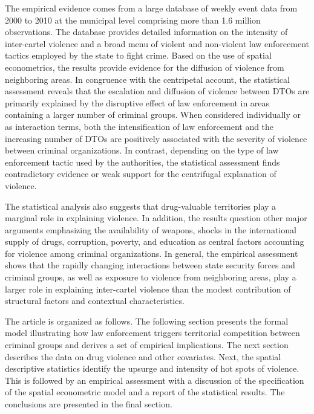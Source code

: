 \documentclass[12pt,letterpaper]{article}
\begin{document}
The empirical evidence comes from a large database of weekly event data from 2000 to 2010 at the municipal level comprising more than 1.6 million observations. The database provides detailed information on the intensity of inter-cartel violence and a broad menu of violent and non-violent law enforcement tactics employed by the state to fight crime. Based on the use of spatial econometrics, the results provide  evidence for the diffusion of violence from neighboring areas. In congruence with the centripetal account, the statistical assessment reveals that the escalation and diffusion of violence between DTOs are primarily explained by the disruptive effect of law enforcement in areas containing a larger number of criminal groups. When considered individually or as interaction terms, both the intensification of law enforcement and the increasing number of DTOs are positively associated with the severity of violence between criminal organizations. In contrast, depending on the type of law enforcement tactic used by the authorities, the statistical assessment finds contradictory evidence or weak support for the centrifugal explanation of violence.

The statistical analysis also suggests that drug-valuable territories play a marginal role in explaining violence. In addition, the results question other major arguments emphasizing the availability of weapons, shocks in the international supply of drugs, corruption, poverty, and education as central factors accounting for violence among criminal organizations. In general, the empirical assessment shows that the rapidly changing interactions between state security forces and criminal groups, as well as exposure to violence from neighboring areas, play a larger role in explaining inter-cartel violence than the modest contribution of structural factors and contextual characteristics.

The article is organized as follows. The following section presents the formal model illustrating how law enforcement triggers territorial competition between criminal groups and derives a set of empirical implications. The next section describes the data on drug violence and other covariates. Next, the spatial descriptive statistics identify the upsurge and intensity of hot spots of violence. This is followed by an empirical assessment with a discussion of the specification of the spatial econometric model and a report of the statistical results. The conclusions are presented in the final section.  
\end{document}
